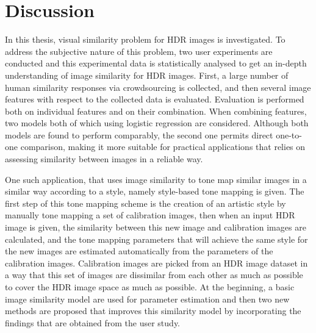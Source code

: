 \chapter{Discussion}
\label{chp:b6}

In this thesis, visual similarity problem for HDR images is investigated. To address the subjective nature of this problem, two user experiments are conducted and this experimental data is  statistically analysed to get an in-depth understanding of image similarity for HDR images. First, a large number of human similarity responses via crowdsourcing is collected, and then several image features with respect to the collected data is evaluated. Evaluation is performed both on individual features and on their combination. When combining features, two models both of which using logistic regression are considered. Although both models are found to perform comparably, the second one permits direct one-to-one comparison, making it more suitable for practical applications that relies on assessing similarity between images in a reliable way. 

One such application, that uses image similarity to tone map similar images in a similar way according to a style, namely style-based tone mapping is given. The first step of this tone mapping scheme is the creation of an artistic style by manually tone mapping a set of calibration images, then when an input HDR image is given, the similarity between this new image and calibration images are calculated, and the tone mapping parameters that will achieve the same style for the new images are estimated automatically from the parameters of the calibration images. Calibration images are picked from an HDR image dataset in a way that this set of images are dissimilar from each other as much as possible to cover the HDR image space as much as possible. At the beginning, a basic image similarity model are used for parameter estimation and then two new methods are proposed that improves this similarity model by incorporating the findings that are obtained from the user study. 

